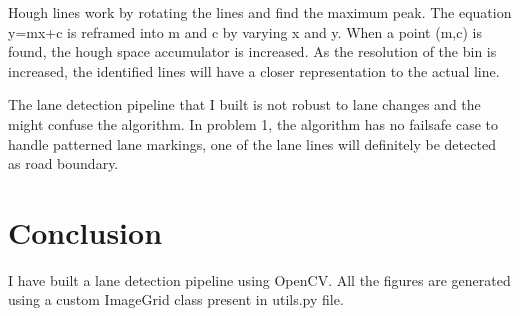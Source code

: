 \documentclass[a4paper, 10pt]{article}
\begin{document}
\begin{multicols}{2}
		Hough lines work by rotating the lines and find the maximum peak. The equation y=mx+c is reframed into m and c by varying x and y. When a point (m,c) is found, the hough space accumulator is increased. As the resolution of the bin is increased, the identified lines will have a closer representation to the actual line. 
		
		The lane detection pipeline that I built is not robust to lane changes and the might confuse the algorithm.
		In problem 1, the algorithm has no failsafe case to handle patterned lane markings, one of the lane lines will definitely be detected as road boundary.
		
		\section{Conclusion}	
		I have built a lane detection pipeline using OpenCV. All the figures are generated using a custom ImageGrid class present in utils.py file. 
		
	\end{multicols}
	
	
	
\end{document}

